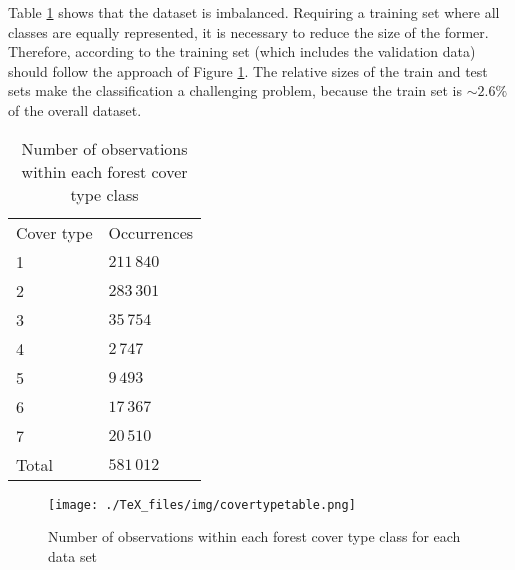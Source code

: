 Table \ref{tab:covertypes} shows that the dataset is imbalanced. Requiring a training set where all classes are equally represented, it is necessary to reduce the size of the former. Therefore, according to \cite{blackardDean} the training set (which includes the validation data) should follow the approach of Figure \ref{fig:covertypesdims}. The relative sizes of the train and test sets make the classification a challenging problem, because the train set is $\sim2.6\%$ of the overall dataset.
\begin{table}
	\centering
	\begin{tabular}{ll}
		Cover type & Occurrences \\
		1          & $211\,840$  \\
		2          & $283\,301$  \\
		3          & $35\,754$   \\
		4          & $2\,747$    \\
		5          & $9\,493$    \\
		6          & $17\,367$   \\
		7          & $20\,510$   \\
		Total      & $581\,012$     
	\end{tabular}
	\caption{Number of observations within each forest cover type class}
	\label{tab:covertypes}
\end{table}
\begin{figure}
	\centering
	\texttt{[image: ./TeX\_files/img/covertypetable.png]}
	\caption{Number of observations within each forest cover type class for each data set}
	\label{fig:covertypesdims}
\end{figure}


